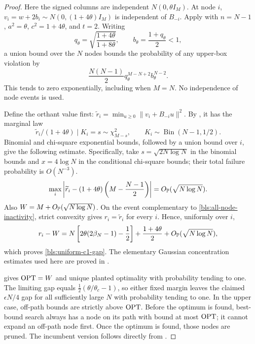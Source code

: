 \begin{proof}
Here the signed columns are independent $N(0,\theta I_M)$.  At node $i$,
$v_i=w+2b_i\sim N(0,(1+4\theta)I_M)$ is independent of $B_{-i}$.
Apply  with
$n=N-1$, $a^2=\theta$, $c^2=1+4\theta$, and $t=2$.  Writing
\[
 q_\theta=\sqrt{\frac{1+4\theta}{1+8\theta}},\qquad
 b_\theta=\frac{1+q_\theta}{2}<1,
\]
a union bound over the $N$ nodes bounds the probability of any upper-box
violation by
\begin{equation}
 \frac{N(N-1)}2 q_\theta^{M-N+2}b_\theta^{N-2}.
 \label{bls:all-node-inactivity}
\end{equation}
This tends to zero exponentially, including when $M=N$.  No independence
of node events is used.

Define the orthant value first:
$\widetilde r_i=\min_{u\ge0}\|v_i+B_{-i}u\|^2$.
By , it has the marginal law
\[
 \widetilde r_i/(1+4\theta)\mid K_i=s\sim\chi^2_{M-s},
 \qquad K_i\sim\operatorname{Bin}(N-1,1/2).
\]
Binomial and chi-square exponential bounds, followed by a union bound over
$i$, give the following estimate.  Specifically, take
$s=\sqrt{2N\log N}$ in the binomial bounds and $x=4\log N$ in the
conditional chi-square bounds; their total failure probability is
$O(N^{-3})$.
\[
 \max_i\left|\widetilde r_i-
 (1+4\theta)\left(M-\frac{N-1}2\right)\right|
 =O_{\mathbb{P}}(\sqrt{N\log N}).
\]
Also $W=M+O_{\mathbb{P}}(\sqrt{N\log N})$.  On the event complementary to
\eqref{bls:all-node-inactivity}, strict convexity gives
$r_i=\widetilde r_i$ for every $i$.  Hence, uniformly over $i$,
\begin{equation}
 r_i-W=N\left[2\theta(2\beta_N-1)-\frac12\right]
       +\frac{1+4\theta}2+O_{\mathbb{P}}(\sqrt{N\log N}),
 \label{bls:finite-c1-expansion}
\end{equation}
which proves \eqref{bls:uniform-c1-gap}.  The elementary Gaussian
concentration estimates used here are proved in
.

 gives $\operatorname{OPT}=W$ and unique planted optimality with probability
tending to one.  The limiting gap equals
$\tfrac12(\theta/\theta_c-1)$, so either fixed margin leaves the claimed
$\epsilon N/4$ gap for all sufficiently large $N$ with probability
tending to one.  In the upper case, off-path bounds are strictly above
$\operatorname{OPT}$.  Before the optimum is found, best-bound search always has a
node on its path with bound at most $\operatorname{OPT}$; it cannot expand an off-path
node first.  Once the optimum is found, those nodes are pruned.  The
incumbent version follows directly from .
\end{proof}

